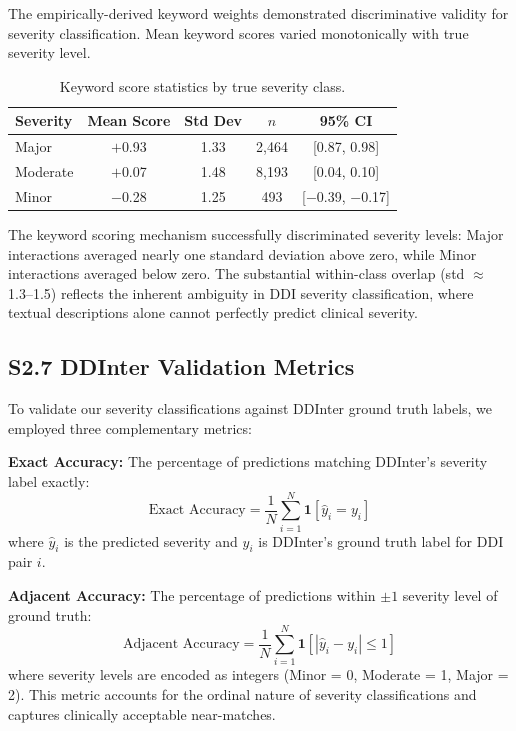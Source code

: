 \documentclass[12pt,a4paper]{article}
\begin{document}
The empirically-derived keyword weights demonstrated discriminative validity for severity classification. Mean keyword scores varied monotonically with true severity level.

\begin{table}[H]
\centering
\caption{Keyword score statistics by true severity class.}
\label{tab:score_severity}
\begin{tabular}{@{}lcccc@{}}
\toprule
\textbf{Severity} & \textbf{Mean Score} & \textbf{Std Dev} & \textbf{$n$} & \textbf{95\% CI} \\
\midrule
Major & $+$0.93 & 1.33 & 2,464 & [0.87, 0.98] \\
Moderate & $+$0.07 & 1.48 & 8,193 & [0.04, 0.10] \\
Minor & $-$0.28 & 1.25 & 493 & [$-$0.39, $-$0.17] \\
\bottomrule
\end{tabular}
\end{table}

\noindent The keyword scoring mechanism successfully discriminated severity levels: Major interactions averaged nearly one standard deviation above zero, while Minor interactions averaged below zero. The substantial within-class overlap (std $\approx$ 1.3--1.5) reflects the inherent ambiguity in DDI severity classification, where textual descriptions alone cannot perfectly predict clinical severity.

\bigskip
\subsection{S2.7 DDInter Validation Metrics}

To validate our severity classifications against DDInter ground truth labels, we employed three complementary metrics:

\textbf{Exact Accuracy:} The percentage of predictions matching DDInter's severity label exactly:
\[
\text{Exact Accuracy} = \frac{1}{N} \sum_{i=1}^{N} \mathbf{1}[\hat{y}_i = y_i]
\]
where $\hat{y}_i$ is the predicted severity and $y_i$ is DDInter's ground truth label for DDI pair $i$.

\textbf{Adjacent Accuracy:} The percentage of predictions within $\pm 1$ severity level of ground truth:
\[
\text{Adjacent Accuracy} = \frac{1}{N} \sum_{i=1}^{N} \mathbf{1}[|\hat{y}_i - y_i| \leq 1]
\]
where severity levels are encoded as integers (Minor = 0, Moderate = 1, Major = 2). This metric accounts for the ordinal nature of severity classifications and captures clinically acceptable near-matches.
\end{document}
